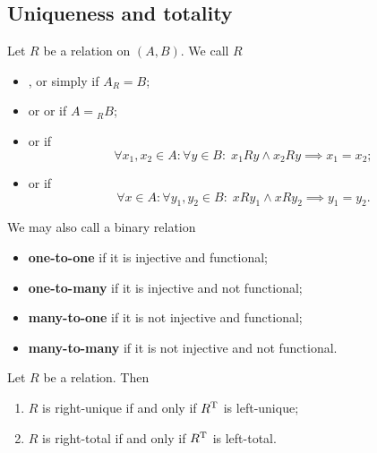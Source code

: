 \subsection{Uniqueness and totality}
\begin{definition}
Let $R$ be a relation on $(A, B)$. We call $R$
\begin{itemize}
\item {},  or simply  if $A_R = B$;
\item {} or  or  if $A = {_RB}$;
\item {} or  if
\[ \forall x_1,x_2\in A: \forall y\in B: \; x_1Ry \land x_2Ry \implies x_1=x_2; \]
\item {} or  if
\[ \forall x\in A: \forall y_1,y_2\in B: \; xRy_1 \land xRy_2 \implies y_1=y_2. \]
\end{itemize}
We may also call a binary relation
\begin{itemize}
\item \textbf{one-to-one} if it is injective and functional;
\item \textbf{one-to-many} if it is injective and not functional;
\item \textbf{many-to-one} if it is not injective and functional;
\item \textbf{many-to-many} if it is not injective and not functional.
\end{itemize}
\end{definition}

\begin{lemma}
Let $R$ be a relation. Then
\begin{enumerate}
\item $R$ is right-unique \textup{if and only if} $R^{\mathrm{T}}$ is left-unique;
\item $R$ is right-total \textup{if and only if} $R^{\mathrm{T}}$ is left-total.
\end{enumerate}
\end{lemma}

